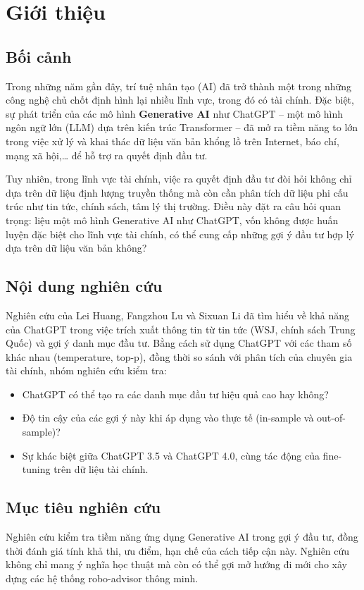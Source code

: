 \documentclass[a4paper,12pt]{article}
\begin{document}
\section{Giới thiệu}

\subsection{Bối cảnh}
Trong những năm gần đây, trí tuệ nhân tạo (AI) đã trở thành một trong những công nghệ chủ chốt định hình lại nhiều lĩnh vực, trong đó có tài chính. Đặc biệt, sự phát triển của các mô hình \textbf{Generative AI} như ChatGPT – một mô hình ngôn ngữ lớn (LLM) dựa trên kiến trúc Transformer – đã mở ra tiềm năng to lớn trong việc xử lý và khai thác dữ liệu văn bản khổng lồ trên Internet, báo chí, mạng xã hội,… để hỗ trợ ra quyết định đầu tư.

Tuy nhiên, trong lĩnh vực tài chính, việc ra quyết định đầu tư đòi hỏi không chỉ dựa trên dữ liệu định lượng truyền thống mà còn cần phân tích dữ liệu phi cấu trúc như tin tức, chính sách, tâm lý thị trường. Điều này đặt ra câu hỏi quan trọng: liệu một mô hình Generative AI như ChatGPT, vốn không được huấn luyện đặc biệt cho lĩnh vực tài chính, có thể cung cấp những gợi ý đầu tư hợp lý dựa trên dữ liệu văn bản không?

\subsection{Nội dung nghiên cứu}
Nghiên cứu của Lei Huang, Fangzhou Lu và Sixuan Li đã tìm hiểu về khả năng của ChatGPT trong việc trích xuất thông tin từ tin tức (WSJ, chính sách Trung Quốc) và gợi ý danh mục đầu tư. Bằng cách sử dụng ChatGPT với các tham số khác nhau (temperature, top-p), đồng thời so sánh với phân tích của chuyên gia tài chính, nhóm nghiên cứu kiểm tra:
\begin{itemize}
    \item ChatGPT có thể tạo ra các danh mục đầu tư hiệu quả cao hay không?
    \item Độ tin cậy của các gợi ý này khi áp dụng vào thực tế (in-sample và out-of-sample)?
    \item Sự khác biệt giữa ChatGPT 3.5 và ChatGPT 4.0, cùng tác động của fine-tuning trên dữ liệu tài chính.
\end{itemize}

\subsection{Mục tiêu nghiên cứu}
Nghiên cứu kiểm tra tiềm năng ứng dụng Generative AI trong gợi ý đầu tư, đồng thời đánh giá tính khả thi, ưu điểm, hạn chế của cách tiếp cận này. Nghiên cứu không chỉ mang ý nghĩa học thuật mà còn có thể gợi mở hướng đi mới cho xây dựng các hệ thống robo-advisor thông minh.
\end{document}
